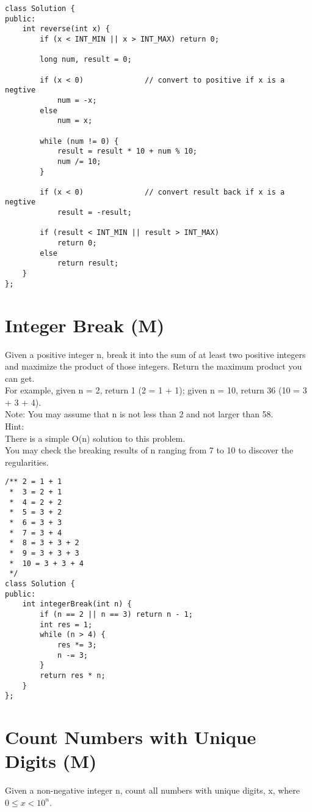 \begin{lstlisting}
class Solution {
public:
    int reverse(int x) {
        if (x < INT_MIN || x > INT_MAX) return 0;
       
        long num, result = 0;
      
        if (x < 0)              // convert to positive if x is a negtive
            num = -x;
        else
            num = x;
      
        while (num != 0) {
            result = result * 10 + num % 10;
            num /= 10;
        }
        
        if (x < 0)              // convert result back if x is a negtive
            result = -result;

        if (result < INT_MIN || result > INT_MAX)
            return 0;
        else
            return result;
    }
};
\end{lstlisting}


\section{Integer Break (M)}
Given a positive integer n, break it into the sum of at least two positive integers and maximize the product of those integers. Return the maximum product you can get.\\

For example, given n = 2, return 1 (2 = 1 + 1); given n = 10, return 36 (10 = 3 + 3 + 4).\\

Note: You may assume that n is not less than 2 and not larger than 58.\\

Hint:\\
    There is a simple O(n) solution to this problem.\\
    You may check the breaking results of n ranging from 7 to 10 to discover the regularities.\\

\begin{lstlisting}
/** 2 = 1 + 1
 *  3 = 2 + 1
 *  4 = 2 + 2
 *  5 = 3 + 2
 *  6 = 3 + 3
 *  7 = 3 + 4
 *  8 = 3 + 3 + 2
 *  9 = 3 + 3 + 3
 *  10 = 3 + 3 + 4
 */
class Solution {
public:
    int integerBreak(int n) {
        if (n == 2 || n == 3) return n - 1;
        int res = 1;
        while (n > 4) {
            res *= 3;
            n -= 3;
        }
        return res * n;
    }
};
\end{lstlisting}


\section{Count Numbers with Unique Digits (M)}
Given a non-negative integer n, count all numbers with unique digits, x, where $0 \leq x < 10^n$.\\

